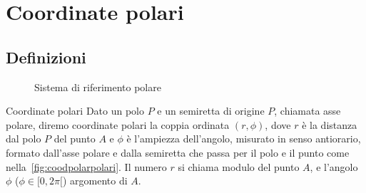 \chapter{Coordinate polari}
\section{Definizioni}
\label{Cha:CoordinatePolariTrig}
\begin{figure} %
	\centering
	
	\caption{Sistema di riferimento polare}\label{fig:coodpolarpolari}
\end{figure}
\begin{definizionet}{Coordinate polari}{}
Dato un polo $P$ e un semiretta di origine $P$, chiamata asse polare, diremo coordinate polari la coppia ordinata $(r,\phi)$, dove $r$ è la distanza dal polo $P$ del punto $A$ e $\phi$ è l'ampiezza dell'angolo, misurato in senso antiorario, formato dall'asse polare e dalla semiretta che passa per il polo e il punto come nella~\vref{fig:coodpolarpolari}. Il numero $r$ si chiama modulo del punto $A$, e l'angolo $\phi$ ($\phi\in[0,2\pi[$) argomento di $A$. 
\end{definizionet}
